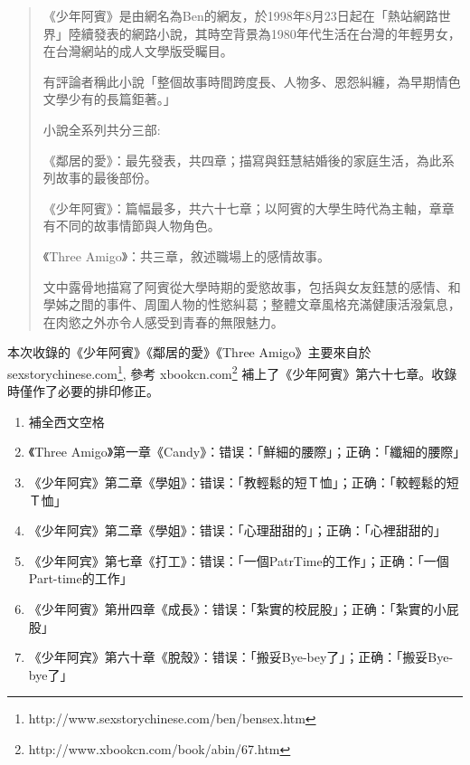 
\begin{quotation}
    《少年阿賓》是由網名為Ben的網友，於1998年8月23日起在「熱站網路世界」陸續發表的網路小說，其時空背景為1980年代生活在台灣的年輕男女，在台灣網站的成人文學版受矚目。

有評論者稱此小說「整個故事時間跨度長、人物多、恩怨糾纏，為早期情色文學少有的長篇鉅著。」

小說全系列共分三部:

《鄰居的愛》：最先發表，共四章；描寫與鈺慧結婚後的家庭生活，為此系列故事的最後部份。

《少年阿賓》：篇幅最多，共六十七章；以阿賓的大學生時代為主軸，章章有不同的故事情節與人物角色。

《Three Amigo》：共三章，敘述職場上的感情故事。

文中露骨地描寫了阿賓從大學時期的愛慾故事，包括與女友鈺慧的感情、和學姊之間的事件、周圍人物的性慾糾葛；整體文章風格充滿健康活潑氣息，在肉慾之外亦令人感受到青春的無限魅力。

\end{quotation}

本次收錄的《少年阿賓》《鄰居的愛》《Three Amigo》主要來自於sexstorychinese.com\footnote{http://www.sexstorychinese.com/ben/bensex.htm}, 參考 xbookcn.com\footnote{http://www.xbookcn.com/book/abin/67.htm} 補上了《少年阿賓》第六十七章。收錄時僅作了必要的排印修正。

\begin{enumerate}
\item 補全西文空格
\item 《Three Amigo》第一章《Candy》：错误：「鮮細的腰際」；正确：「纖細的腰際」
\item 《少年阿宾》第二章《學姐》：错误：「教輕鬆的短Ｔ恤」；正确：「較輕鬆的短Ｔ恤」
\item 《少年阿宾》第二章《學姐》：错误：「心理甜甜的」；正确：「心裡甜甜的」
\item 《少年阿宾》第七章《打工》：错误：「一個PatrTime的工作」；正确：「一個Part-time的工作」
\item 《少年阿賓》第卅四章《成長》：错误：「紮實的校屁股」；正确：「紮實的小屁股」
\item 《少年阿宾》第六十章《脫殼》：错误：「搬妥Bye-bey了」；正确：「搬妥Bye-bye了」
\end{enumerate}
